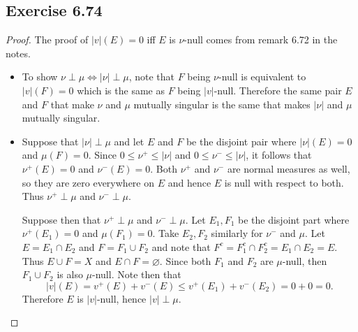 \documentclass[hw_all.tex]{subfiles}
\begin{document}
\subsection{Exercise 6.74}
\begin{proof}
    The proof of $|v|(E) = 0$ iff $E$ is $\nu$-null comes from remark 6.72 in the notes.
    \begin{itemize}
        \item
            To show $\nu \perp \mu \Leftrightarrow |\nu| \perp \mu$, note that $F$ being $\nu$-null is equivalent to $|v|(F) = 0$ which is the same as $F$ being $|v|$-null. Therefore the same pair $E$ and $F$ that make $\nu$ and $\mu$ mutually singular is the same that makes $|\nu|$ and $\mu$ mutually singular.
            
        \item 
            Suppose that $|\nu| \perp \mu$ and let $E$ and $F$ be the disjoint pair where $|\nu|(E) = 0$ and $\mu(F) = 0$. Since $0 \leq \nu^+ \leq |\nu|$ and $0 \leq \nu^- \leq |\nu|$, it follows that $\nu^+(E) = 0$ and $\nu^-(E) = 0$. Both $\nu^+$ and $\nu^-$ are normal measures as well, so they are zero everywhere on $E$ and hence $E$ is null with respect to both. Thus $\nu^+ \perp \mu$ and $\nu^- \perp \mu$.

            Suppose then that $\nu^+ \perp \mu$ and $\nu^- \perp \mu$. Let $E_1, F_1$ be the disjoint part where $\nu^+(E_1) = 0$ and $\mu(F_1) = 0$. Take $E_2, F_2$ similarly for $\nu^-$ and $\mu$. Let $E = E_1 \cap E_2$ and $F = F_1 \cup F_2$ and note that $F^c = F_1^c \cap F_2^c = E_1 \cap E_2 = E$. Thus $E \cup F = X$ and $E \cap F = \varnothing$. Since both $F_1$ and $F_2$ are $\mu$-null, then $F_1 \cup F_2$ is also $\mu$-null. Note then that
            \[
                |v|(E) = v^+(E) + v^-(E) \leq v^+(E_1) + v^-(E_2) = 0 + 0 = 0
            .\]
            Therefore $E$ is $|v|$-null, hence $|v| \perp \mu$.
    \end{itemize}
\end{proof}
\end{document}
